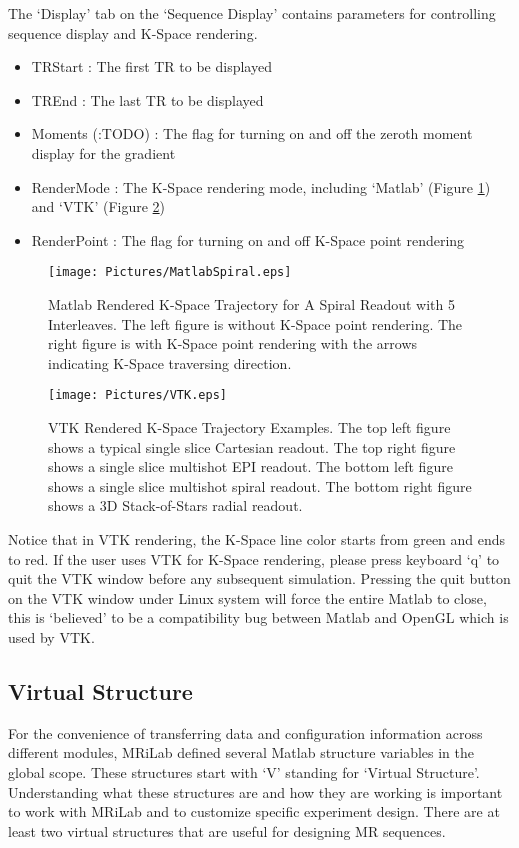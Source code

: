 \documentclass{book}%
\begin{document}
\begin{enumerate}
The `Display' tab on the `Sequence Display' contains parameters for controlling sequence display and K-Space rendering.

\begin{itemize}
	\item TRStart : The first TR to be displayed
	\item TREnd : The last TR to be displayed
	\item Moments (:TODO) : The flag for turning on and off the zeroth moment display for the gradient
	\item RenderMode : The K-Space rendering mode, including `Matlab' (Figure \ref{fig:MatlabSpiral}) and `VTK' (Figure \ref{fig:VTK})
	\item RenderPoint : The flag for turning on and off K-Space point rendering
\end{itemize}	

\begin{figure}[htbp]
	\centering
		\texttt{[image: Pictures/MatlabSpiral.eps]}
	\caption{Matlab Rendered K-Space Trajectory for A Spiral Readout with 5 Interleaves. The left figure is without K-Space point rendering. The right figure is with K-Space point rendering with the arrows indicating K-Space traversing direction.}
	\label{fig:MatlabSpiral}
\end{figure}	
	
\begin{figure}[htbp]
	\centering
		\texttt{[image: Pictures/VTK.eps]}
	\caption{VTK Rendered K-Space Trajectory Examples. The top left figure shows a typical single slice Cartesian readout. The top right figure shows a single slice multishot EPI readout. The bottom left figure shows a single slice multishot spiral readout. The bottom right figure shows a 3D Stack-of-Stars radial readout.}
	\label{fig:VTK}
\end{figure}		
	
Notice that in VTK rendering, the K-Space line color starts from green and ends to red. If the user uses VTK for K-Space rendering, please press keyboard `q' to quit the VTK window before any subsequent simulation. Pressing the quit button on the VTK window under Linux system will force the entire Matlab to close, this is `believed' to be a compatibility bug between Matlab and OpenGL which is used by VTK.

\end{enumerate}	

\subsection{Virtual Structure}
For the convenience of transferring data and configuration information across different modules, MRiLab defined several Matlab structure variables in the global scope. These structures start with `V' standing for `Virtual Structure'. Understanding what these structures are and how they are working is important to work with MRiLab and to customize specific experiment design. There are at least two virtual structures that are useful for designing MR sequences.
\end{document}
